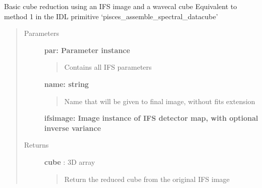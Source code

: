 \documentclass[letterpaper,10pt,english]{sphinxmanual}
\begin{document}
\begin{fulllineitems}
\label{tools:tools.reduction.simpleReduction}
Basic cube reduction using an IFS image and a wavecal cube
Equivalent to method 1 in the IDL primitive `pisces\_assemble\_spectral\_datacube'
\begin{quote}\begin{description}
\item[{Parameters}] \leavevmode
\textbf{par:    Parameter instance}
\begin{quote}

Contains all IFS parameters
\end{quote}

\textbf{name: string}
\begin{quote}

Name that will be given to final image, without fits extension
\end{quote}

\textbf{ifsimage: Image instance of IFS detector map, with optional inverse variance}

\item[{Returns}] \leavevmode
\textbf{cube} :  3D array
\begin{quote}

Return the reduced cube from the original IFS image
\end{quote}

\end{description}\end{quote}

\end{fulllineitems}

\end{document}
